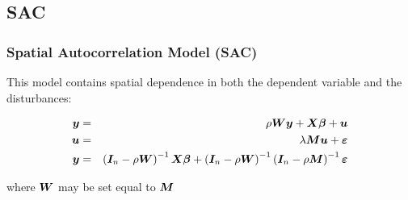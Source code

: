 \documentclass[english,10pt]{beamer}\usepackage[]{graphicx}\usepackage[]{xcolor}
\begin{document}
\subsection{SAC}

\begin{frame}
  \frametitle{Spatial Autocorrelation Model (SAC)}
  
  This model contains spatial dependence in both the dependent variable and the disturbances:
  
      \begin{eqnarray*}
     \bm y &=& \rho \bm W \bm y + \bm X\bm \beta + \bm u \\
     \bm u &=& \lambda\bm M\bm u + \bm {\varepsilon} \\
     \bm y & = & \left(\bm I_n - \rho \bm W\right)^{-1}\bm X\bm \beta + \left(\bm I_n - \rho \bm W\right)^{-1}\left(\bm I_n - \rho \bm M\right)^{-1}\bm {\varepsilon}
    \end{eqnarray*}
    
    where $\bm W$ may be set equal to $\bm M$
\end{frame}
\end{document}
